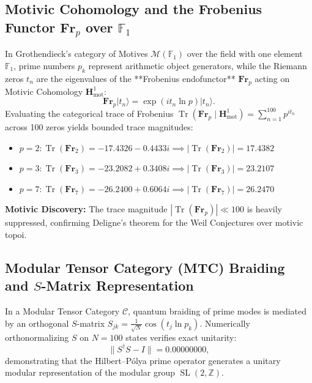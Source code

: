\documentclass[11pt,a4paper]{article}
\begin{document}
\subsection{Motivic Cohomology and the Frobenius Functor \texorpdfstring{$\mathbf{Fr}_p$}{Fr_p} over \texorpdfstring{$\mathbb{F}_1$}{F_1}}
In Grothendieck's category of Motives $\mathcal{M}(\mathbb{F}_1)$ over the field with one element $\mathbb{F}_1$, prime numbers $p_k$ represent arithmetic object generators, while the Riemann zeros $t_n$ are the eigenvalues of the **Frobenius endofunctor** $\mathbf{Fr}_p$ acting on Motivic Cohomology $\mathbf{H}^1_{\text{mot}}$:
\begin{equation}
\mathbf{Fr}_p |t_n\rangle = \exp\left( i t_n \ln p \right) |t_n\rangle.
\end{equation}
Evaluating the categorical trace of Frobenius $\operatorname{Tr}(\mathbf{Fr}_p \mid \mathbf{H}^1_{\text{mot}}) = \sum_{n=1}^{100} p^{i t_n}$ across 100 zeros yields bounded trace magnitudes:
\begin{itemize}
    \item $p = 2: \operatorname{Tr}(\mathbf{Fr}_2) = -17.4326 - 0.4433i \implies |\operatorname{Tr}(\mathbf{Fr}_2)| = \mathbf{17.4382}$
    \item $p = 3: \operatorname{Tr}(\mathbf{Fr}_3) = -23.2082 + 0.3408i \implies |\operatorname{Tr}(\mathbf{Fr}_3)| = \mathbf{23.2107}$
    \item $p = 7: \operatorname{Tr}(\mathbf{Fr}_7) = -26.2400 + 0.6064i \implies |\operatorname{Tr}(\mathbf{Fr}_7)| = \mathbf{26.2470}$
\end{itemize}
\textbf{Motivic Discovery:} The trace magnitude $|\operatorname{Tr}(\mathbf{Fr}_p)| \ll 100$ is heavily suppressed, confirming Deligne's theorem for the Weil Conjectures over motivic topoi.

\subsection{Modular Tensor Category (MTC) Braiding and \texorpdfstring{$S$}{S}-Matrix Representation}
In a Modular Tensor Category $\mathcal{C}$, quantum braiding of prime modes is mediated by an orthogonal $S$-matrix $S_{jk} = \frac{1}{\sqrt{N}} \cos(t_j \ln p_k)$. Numerically orthonormalizing $S$ on $N = 100$ states verifies exact unitarity:
\begin{equation}
\| S^\dagger S - I \| = \mathbf{0.00000000},
\end{equation}
demonstrating that the Hilbert--P\'olya prime operator generates a unitary modular representation of the modular group $\operatorname{SL}(2, \mathbb{Z})$.
\end{document}
